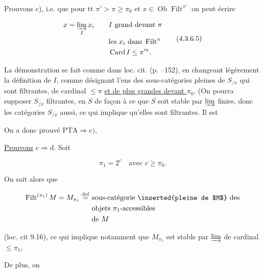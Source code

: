 

Prouvons c), i.e. que pour tt $\pi'>\pi\geq\pi_0$ et  $x\in\operatorname{Ob}\operatorname{Filt}^{\pi'}$ on peut écrire

\[
\begin{aligned}
x=\varinjlim_I x_i\qquad & I\ \text{grand devant }\pi\\
&\text{les }x_i\text{ dans }\operatorname{Filt}^{\pi}\\
&\operatorname{Card} I\leq\pi'^{\pi}.
\end{aligned}\tag*{(4.3.6.5)}
\]

La démonstration se fait comme dans  loc. cit. (p. --152), en changeant légèrement la définition de $I$, comme désignant l'ens des sous-catégories pleines  de $S_{/x}$ qui sont filtrantes, de cardinal $\leq\pi$ \uline{et de plus grandes devant $\pi_0$}. (On pourra supposer  $S_{/x}$ filtrantes, en   $S$ de façon à ce que $S$ soit stable  par  $\varinjlim$ finies, donc les catégories $S_{/x}$ aussi, ce qui implique qu'elles sont filtrantes. Il est


On a donc prouvé $\mathrm{PTA}\Longrightarrow\mathrm{c})$,

\uline{Prouvons} $\mathrm c\Longrightarrow\mathrm d$. Soit  

\[
\pi_1=2^c\quad\text{avec }c\geq\pi_0.
\]

On sait alors que

\[
\begin{aligned}
\operatorname{Filt}^{(\pi_1)}M=M_{\pi_1}\overset{\mathrm{def}}{=}\ &\text{sous-catégorie \inserted{pleine de $M$} des}\\
&\text{objets }\pi_1\text{-accessibles}\\
&\text{de }M
\end{aligned}
\]

(loc. cit 9.16), ce qui implique notamment que $M_{\pi_1}$ est stable par $\varinjlim$ de cardinal $\leq\pi_1$, 


De plus, on

